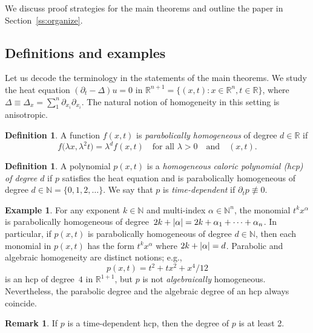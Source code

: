 \documentclass[10pt]{amsart}
\theoremstyle{definition}\newtheorem{defi}[theo]{Definition}\newtheorem{rema}[theo]{Remark}\newtheorem{exam}[theo]{Example}\newtheorem{exem}[theo]{Example}\newtheorem{nota}[theo]{Notation}
\newcommand{\N}{\mathbb{N}}
\newcommand{\R}{\mathbb{R}}
\newcommand{\abs}[1]{\left \lvert #1 \right \rvert}
\let\originalleft\left
\let\originalright\right
\renewcommand{\left}{\mathopen{}\mathclose\bgroup\originalleft}
\renewcommand{\right}{\aftergroup\egroup\originalright}
\begin{document}
We discuss proof strategies for the main theorems and outline the paper in Section~\ref{ss:organize}.

\subsection{Definitions and examples}\label{ss:defs}

Let us decode the terminology in the statements of the main theorems. We study the heat equation $(\partial_t - \Delta) u = 0$ in $\R^{n+1} = \{ (x,t) : x \in \R^n, t \in \R \}$, where $\Delta\equiv \Delta_x=\sum_1^n \partial_{x_i}\partial_{x_i}$. The natural notion of homogeneity in this setting is anisotropic.

\begin{defi}
A function $f(x,t)$ is \emph{parabolically homogeneous} of degree $d \in \R $ if
\begin{equation}
f\bigl(\lambda x, \lambda^2 t\bigr) = \lambda^d f(x,t)\quad\text{for all }\lambda > 0\quad\text{and}\quad(x,t).
\end{equation}
\end{defi}

\begin{defi}
A polynomial $p(x,t)$ is a \emph{homogeneous caloric polynomial (hcp) of degree $d$} if $p$ satisfies the heat equation and is parabolically homogeneous{} of degree $d \in \N=\{0,1,2,\dots\}$. We say that $p$ is \emph{time-dependent} if $\partial_t p \not\equiv 0$.
\end{defi}

\begin{exam}\label{eg:hcp}
For any exponent $k\in \N$ and multi-index $\alpha\in\N^n$, the monomial $t^k x^\alpha$ is parabolically homogeneous{} of degree~$2k + \abs{\alpha}=2k+\alpha_1+\dots+\alpha_n$. In particular, if $p(x,t)$ is parabolically homogeneous{} of degree $d \in \N$, then each monomial in $p(x,t)$ has the form $t^k x^\alpha$ where $2k + \abs{\alpha} = d$. Parabolic and algebraic homogeneity are distinct notions; e.g.,
\begin{equation}
p(x,t)= t^2 +tx^2 + x^4/12
\end{equation}
is an hcp of degree~$4$ in $\R^{1+1}$, but $p$ is not \emph{algebraically} homogeneous. Nevertheless, the parabolic degree and the algebraic degree of an hcp always coincide.
\end{exam}

\begin{rema}
If $p$ is a time-dependent hcp, then the degree of $p$ is at least 2.
\end{rema}
\end{document}
